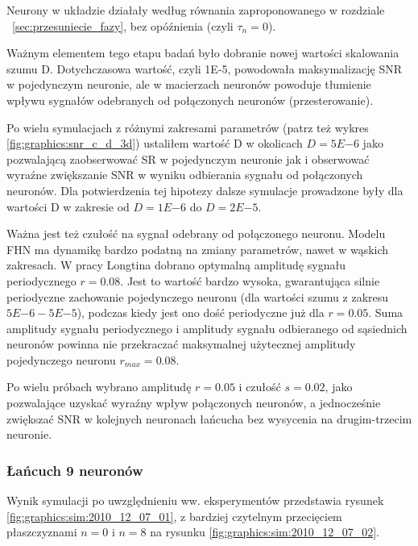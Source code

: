   Neurony w układzie działały według równania zaproponowanego w rozdziale ~\ref{sec:przesuniecie_fazy}, bez opóźnienia (czyli $\tau_{n} = 0$).

  Ważnym elementem tego etapu badań było dobranie nowej wartości skalowania szumu D. Dotychczasowa wartość, czyli 1E-5, powodowała maksymalizację SNR w pojedynczym neuronie, ale w macierzach neuronów powoduje tłumienie wpływu sygnałów odebranych od połączonych neuronów (przesterowanie).

  Po wielu symulacjach z różnymi zakresami parametrów (patrz też wykres \ref{fig:graphics:snr_c_d_3d}) ustaliłem wartość D w okolicach $D=5E{-6}$ jako pozwalającą zaobserwować SR w pojedynczym neuronie jak i obserwować wyraźne zwiększanie SNR w wyniku odbierania sygnału od połączonych neuronów. Dla potwierdzenia tej hipotezy dalsze symulacje prowadzone były dla wartości D w zakresie od $D=1E{-6}$ do $D=2E{-5}$. 

  Ważna jest też czułość na sygnał odebrany od połączonego neuronu. Modelu FHN ma dynamikę bardzo podatną na zmiany parametrów, nawet w wąskich zakresach. W pracy Longtina dobrano optymalną amplitudę sygnału periodycznego $r=0.08$. Jest to wartość bardzo wysoka, gwarantująca silnie periodyczne zachowanie pojedynczego neuronu (dla wartości szumu z zakresu $5E{-6} - 5E{-5}$), podczas kiedy jest ono dość periodyczne już dla $r=0.05$. Suma amplitudy sygnału periodycznego i amplitudy sygnału odbieranego od sąsiednich neuronów powinna nie przekraczać maksymalnej użytecznej amplitudy pojedynczego neuronu $r_{max}=0.08$.
  
  Po wielu próbach wybrano amplitudę $r=0.05$ i czułość $s=0.02$, jako pozwalające uzyskać wyraźny wpływ połączonych neuronów, a jednocześnie zwiększać SNR w kolejnych neuronach łańcucha bez wysycenia na drugim-trzecim neuronie.

  \subsubsection{Łańcuch 9 neuronów}

  Wynik symulacji po uwzględnieniu ww. eksperymentów przedstawia rysunek \ref{fig:graphics:sim:2010_12_07_01}, z bardziej czytelnym przecięciem płaszczyznami $n=0$ i $n=8$ na rysunku \ref{fig:graphics:sim:2010_12_07_02}.

